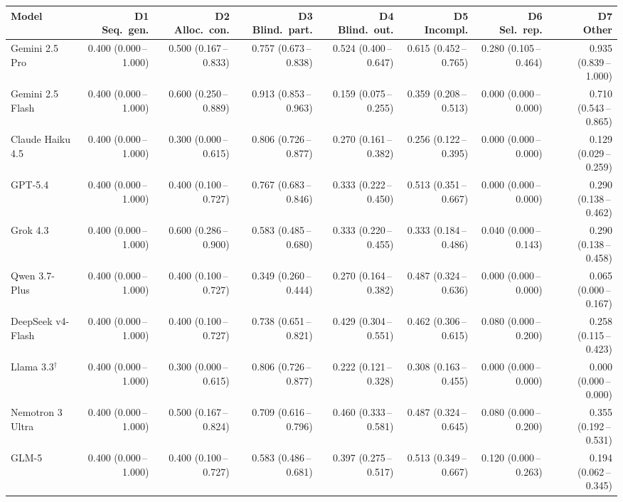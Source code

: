 \begin{tabular}{lrrrrrrr}
\toprule
Model & \makecell{D1\\Seq.\ gen.} & \makecell{D2\\Alloc.\ con.} & \makecell{D3\\Blind.\ part.} & \makecell{D4\\Blind.\ out.} & \makecell{D5\\Incompl.} & \makecell{D6\\Sel.\ rep.} & \makecell{D7\\Other} \\
\midrule
Gemini 2.5 Pro & 0.400 (0.000\,--\,1.000) & 0.500 (0.167\,--\,0.833) & 0.757 (0.673\,--\,0.838) & 0.524 (0.400\,--\,0.647) & 0.615 (0.452\,--\,0.765) & 0.280 (0.105\,--\,0.464) & 0.935 (0.839\,--\,1.000) \\
Gemini 2.5 Flash & 0.400 (0.000\,--\,1.000) & 0.600 (0.250\,--\,0.889) & 0.913 (0.853\,--\,0.963) & 0.159 (0.075\,--\,0.255) & 0.359 (0.208\,--\,0.513) & 0.000 (0.000\,--\,0.000) & 0.710 (0.543\,--\,0.865) \\
Claude Haiku 4.5 & 0.400 (0.000\,--\,1.000) & 0.300 (0.000\,--\,0.615) & 0.806 (0.726\,--\,0.877) & 0.270 (0.161\,--\,0.382) & 0.256 (0.122\,--\,0.395) & 0.000 (0.000\,--\,0.000) & 0.129 (0.029\,--\,0.259) \\
GPT-5.4 & 0.400 (0.000\,--\,1.000) & 0.400 (0.100\,--\,0.727) & 0.767 (0.683\,--\,0.846) & 0.333 (0.222\,--\,0.450) & 0.513 (0.351\,--\,0.667) & 0.000 (0.000\,--\,0.000) & 0.290 (0.138\,--\,0.462) \\
Grok 4.3 & 0.400 (0.000\,--\,1.000) & 0.600 (0.286\,--\,0.900) & 0.583 (0.485\,--\,0.680) & 0.333 (0.220\,--\,0.455) & 0.333 (0.184\,--\,0.486) & 0.040 (0.000\,--\,0.143) & 0.290 (0.138\,--\,0.458) \\
Qwen 3.7-Plus & 0.400 (0.000\,--\,1.000) & 0.400 (0.100\,--\,0.727) & 0.349 (0.260\,--\,0.444) & 0.270 (0.164\,--\,0.382) & 0.487 (0.324\,--\,0.636) & 0.000 (0.000\,--\,0.000) & 0.065 (0.000\,--\,0.167) \\
DeepSeek v4-Flash & 0.400 (0.000\,--\,1.000) & 0.400 (0.100\,--\,0.727) & 0.738 (0.651\,--\,0.821) & 0.429 (0.304\,--\,0.551) & 0.462 (0.306\,--\,0.615) & 0.080 (0.000\,--\,0.200) & 0.258 (0.115\,--\,0.423) \\
Llama 3.3$^\dagger$ & 0.400 (0.000\,--\,1.000) & 0.300 (0.000\,--\,0.615) & 0.806 (0.726\,--\,0.877) & 0.222 (0.121\,--\,0.328) & 0.308 (0.163\,--\,0.455) & 0.000 (0.000\,--\,0.000) & 0.000 (0.000\,--\,0.000) \\
Nemotron 3 Ultra & 0.400 (0.000\,--\,1.000) & 0.500 (0.167\,--\,0.824) & 0.709 (0.616\,--\,0.796) & 0.460 (0.333\,--\,0.581) & 0.487 (0.324\,--\,0.645) & 0.080 (0.000\,--\,0.200) & 0.355 (0.192\,--\,0.531) \\
GLM-5 & 0.400 (0.000\,--\,1.000) & 0.400 (0.100\,--\,0.727) & 0.583 (0.486\,--\,0.681) & 0.397 (0.275\,--\,0.517) & 0.513 (0.349\,--\,0.667) & 0.120 (0.000\,--\,0.263) & 0.194 (0.062\,--\,0.345) \\
\bottomrule
\end{tabular}